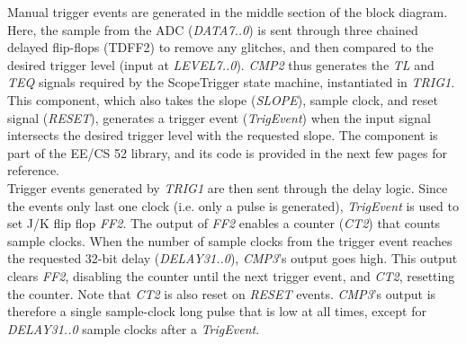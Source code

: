 \documentclass[titlepage]{scrartcl}
\begin{document}
	Manual trigger events are generated in the middle section of the block diagram. Here, the sample from the ADC (\textit{DATA7..0}) is sent through three chained delayed flip-flops (TDFF2) to remove any glitches, and then compared to the desired trigger level (input at \textit{LEVEL7..0}). \textit{CMP2} thus generates the \textit{TL} and \textit{TEQ} signals required by the ScopeTrigger state machine, instantiated in \textit{TRIG1}. This component, which also takes the slope (\textit{SLOPE}), sample clock, and reset signal (\textit{RESET}), generates a trigger event (\textit{TrigEvent}) when the input signal intersects the desired trigger level with the requested slope. The component is part of the EE/CS 52 library, and its code is provided in the next few pages for reference.\\

	

	Trigger events generated by \textit{TRIG1} are then sent through the delay logic. Since the events only last one clock (i.e. only a pulse is generated), \textit{TrigEvent} is used to set J/K flip flop \textit{FF2}. The output of \textit{FF2} enables a counter (\textit{CT2}) that counts sample clocks. When the number of sample clocks from the trigger event reaches the requested 32-bit delay (\textit{DELAY31..0}), \textit{CMP3}'s output goes high. This output clears \textit{FF2}, disabling the counter until the next trigger event, and \textit{CT2}, resetting the counter. Note that \textit{CT2} is also reset on \textit{RESET} events. \textit{CMP3}'s output is therefore a single sample-clock long pulse that is low at all times, except for \textit{DELAY31..0} sample clocks after a \textit{TrigEvent}.\\
\end{document}
